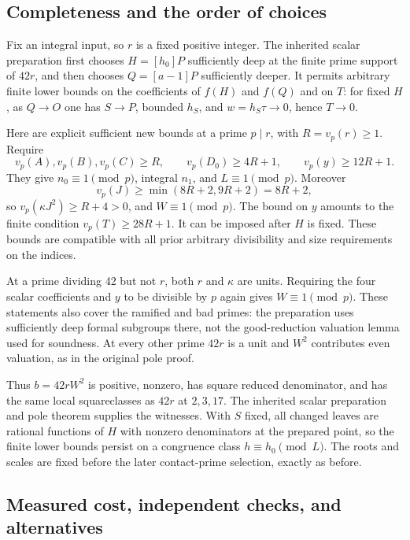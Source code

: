 \subsection{Completeness and the order of choices}

Fix an integral input, so $r$ is a fixed positive integer. The inherited
scalar preparation first chooses $H=[h_0]P$ sufficiently deep at the
finite prime support of $42r$, and then chooses $Q=[a-1]P$ sufficiently
deeper. It permits arbitrary finite lower bounds on the coefficients of
$f(H)$ and $f(Q)$ and on $T$: for fixed $H$, as $Q\to O$ one has
$S\to P$, bounded $h_S$, and $w=h_S\tau\to0$, hence $T\to0$.

Here are explicit sufficient new bounds at a prime $p\mid r$, with
$R=v_p(r)\ge1$. Require
\[
 v_p(A),v_p(B),v_p(C)\ge R,\qquad
 v_p(D_0)\ge4R+1,\qquad v_p(y)\ge12R+1.
\]
They give $n_0\equiv1\pmod p$, integral $n_1$, and
$L\equiv1\pmod p$. Moreover
\[
 v_p(J)\ge\min(8R+2,9R+2)=8R+2,
\]
so $v_p(\kappa J^2)\ge R+4>0$, and $W\equiv1\pmod p$.
The bound on $y$ amounts to the finite condition $v_p(T)\ge28R+1$.
It can be imposed after $H$ is fixed. These bounds are compatible with
all prior arbitrary divisibility and size requirements on the indices.

At a prime dividing 42 but not $r$, both $r$ and $\kappa$ are units.
Requiring the four scalar coefficients and $y$ to be divisible by $p$
again gives $W\equiv1\pmod p$. These statements also cover the
ramified and bad primes: the preparation uses sufficiently deep formal
subgroups there, not the good-reduction valuation lemma used for
soundness. At every other prime $42r$ is a unit and $W^2$ contributes
even valuation, as in the original pole proof.

Thus $b=42rW^2$ is positive, nonzero, has square reduced denominator,
and has the same local squareclasses as $42r$ at $2,3,17$. The inherited
scalar preparation and pole theorem supplies the witnesses. With $S$
fixed, all changed leaves are rational functions of $H$ with nonzero
denominators at the prepared point, so the finite lower bounds persist
on a congruence class $h\equiv h_0\pmod L$. The roots and scales are
fixed before the later contact-prime selection, exactly as before.

\subsection{Measured cost, independent checks, and alternatives}

